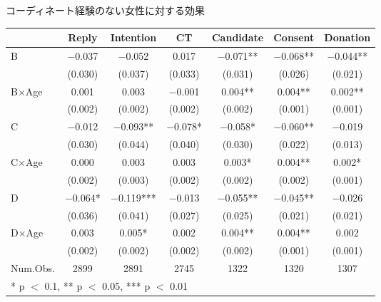 \documentclass[
      aspectratio=169,
        12pt,
    ]{beamer}
\begin{document}
\begin{frame}{コーディネート経験のない女性に対する効果}
\protect\hypertarget{ux30b3ux30fcux30c7ux30a3ux30cdux30fcux30c8ux7d4cux9a13ux306eux306aux3044ux5973ux6027ux306bux5bfeux3059ux308bux52b9ux679c}{}
\begin{table}
\centering
\fontsize{9}{11}\selectfont
\begin{tabular}[t]{lcccccc}
\toprule
  & Reply & Intention & CT & Candidate & Consent & Donation\\
\midrule
B & \num{-0.037} & \num{-0.052} & \num{0.017} & \num{-0.071}** & \num{-0.068}** & \num{-0.044}**\\
 & (\num{0.030}) & (\num{0.037}) & (\num{0.033}) & (\num{0.031}) & (\num{0.026}) & (\num{0.021})\\
B×Age & \num{0.001} & \num{0.003} & \num{-0.001} & \num{0.004}** & \num{0.004}** & \num{0.002}**\\
 & (\num{0.002}) & (\num{0.002}) & (\num{0.002}) & (\num{0.002}) & (\num{0.001}) & \vphantom{1} (\num{0.001})\\
C & \num{-0.012} & \num{-0.093}** & \num{-0.078}* & \num{-0.058}* & \num{-0.060}** & \num{-0.019}\\
 & (\num{0.030}) & (\num{0.044}) & (\num{0.040}) & (\num{0.030}) & (\num{0.022}) & (\num{0.013})\\
C×Age & \num{0.000} & \num{0.003} & \num{0.003} & \num{0.003}* & \num{0.004}** & \num{0.002}*\\
 & (\num{0.002}) & (\num{0.003}) & (\num{0.002}) & (\num{0.002}) & (\num{0.002}) & (\num{0.001})\\
D & \num{-0.064}* & \num{-0.119}*** & \num{-0.013} & \num{-0.055}** & \num{-0.045}** & \num{-0.026}\\
 & (\num{0.036}) & (\num{0.041}) & (\num{0.027}) & (\num{0.025}) & (\num{0.021}) & (\num{0.021})\\
D×Age & \num{0.003} & \num{0.005}* & \num{0.002} & \num{0.004}** & \num{0.004}** & \num{0.002}\\
 & (\num{0.002}) & (\num{0.002}) & (\num{0.002}) & (\num{0.002}) & (\num{0.001}) & (\num{0.001})\\
\midrule
Num.Obs. & \num{2899} & \num{2891} & \num{2745} & \num{1322} & \num{1320} & \num{1307}\\
\bottomrule
\multicolumn{7}{l}{\rule{0pt}{1em}* p $<$ 0.1, ** p $<$ 0.05, *** p $<$ 0.01}\\
\end{tabular}
\end{table}
\end{frame}
\end{document}
